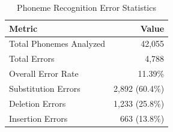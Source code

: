 \begin{table}[h]
\centering
\caption{Phoneme Recognition Error Statistics}
\label{tab:phoneme_errors}
\begin{tabular}{lr}
\hline
\textbf{Metric} & \textbf{Value} \\
\hline
Total Phonemes Analyzed & 42,055 \\
Total Errors & 4,788 \\
Overall Error Rate & 11.39\% \\
\hline
Substitution Errors & 2,892 (60.4\%) \\
Deletion Errors & 1,233 (25.8\%) \\
Insertion Errors & 663 (13.8\%) \\
\hline
\end{tabular}
\end{table}